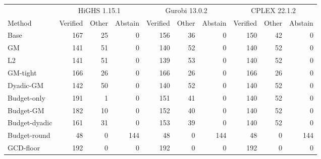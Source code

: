 \begin{tabular}{lrrrrrrrrr}
\toprule
& \multicolumn{3}{c}{HiGHS 1.15.1} & \multicolumn{3}{c}{Gurobi 13.0.2} & \multicolumn{3}{c}{CPLEX 22.1.2} \\
Method & Verified & Other & Abstain & Verified & Other & Abstain & Verified & Other & Abstain \\
\midrule
Base & 167 & 25 & 0 & 156 & 36 & 0 & 150 & 42 & 0 \\
GM & 141 & 51 & 0 & 140 & 52 & 0 & 140 & 52 & 0 \\
L2 & 141 & 51 & 0 & 139 & 53 & 0 & 140 & 52 & 0 \\
GM-tight & 166 & 26 & 0 & 166 & 26 & 0 & 166 & 26 & 0 \\
Dyadic-GM & 142 & 50 & 0 & 140 & 52 & 0 & 140 & 52 & 0 \\
Budget-only & 191 & 1 & 0 & 151 & 41 & 0 & 140 & 52 & 0 \\
Budget-GM & 182 & 10 & 0 & 152 & 40 & 0 & 140 & 52 & 0 \\
Budget-dyadic & 161 & 31 & 0 & 153 & 39 & 0 & 140 & 52 & 0 \\
Budget-round & 48 & 0 & 144 & 48 & 0 & 144 & 48 & 0 & 144 \\
\midrule
GCD-floor & 192 & 0 & 0 & 192 & 0 & 0 & 192 & 0 & 0 \\
\bottomrule
\end{tabular}
